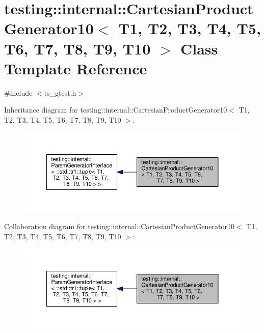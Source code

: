 \hypertarget{classtesting_1_1internal_1_1CartesianProductGenerator10}{\section{testing\-:\-:internal\-:\-:Cartesian\-Product\-Generator10$<$ T1, T2, T3, T4, T5, T6, T7, T8, T9, T10 $>$ Class Template Reference}
\label{classtesting_1_1internal_1_1CartesianProductGenerator10}
}


{\ttfamily \#include $<$ts\-\_\-gtest.\-h$>$}



Inheritance diagram for testing\-:\-:internal\-:\-:Cartesian\-Product\-Generator10$<$ T1, T2, T3, T4, T5, T6, T7, T8, T9, T10 $>$\-:\nopagebreak
\begin{figure}[H]
\begin{center}
\leavevmode
\includegraphics[width=350pt]{classtesting_1_1internal_1_1CartesianProductGenerator10__inherit__graph}
\end{center}
\end{figure}


Collaboration diagram for testing\-:\-:internal\-:\-:Cartesian\-Product\-Generator10$<$ T1, T2, T3, T4, T5, T6, T7, T8, T9, T10 $>$\-:\nopagebreak
\begin{figure}[H]
\begin{center}
\leavevmode
\includegraphics[width=350pt]{classtesting_1_1internal_1_1CartesianProductGenerator10__coll__graph}
\end{center}
\end{figure}

